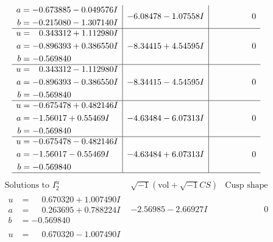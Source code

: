 \documentclass[1p]{elsarticle_modified}
\theoremstyle{definition}
\newcommand{\I}{\sqrt{-1}}
\begin{document}
$$\begin{array}{c|c|c}
\begin{aligned}
a &= -0.673885 - 0.049576 I \\
b &= -0.215080 - 1.307140 I\end{aligned}
 & -6.08478 - 1.07558 I & \phantom{-0.000000 } 0 \\ \hline\begin{aligned}
u &= \phantom{-}0.343312 + 1.112980 I \\
a &= -0.896393 + 0.386550 I \\
b &= -0.569840\phantom{ +0.000000I}\end{aligned}
 & -8.34415 + 4.54595 I & \phantom{-0.000000 } 0 \\ \hline\begin{aligned}
u &= \phantom{-}0.343312 - 1.112980 I \\
a &= -0.896393 - 0.386550 I \\
b &= -0.569840\phantom{ +0.000000I}\end{aligned}
 & -8.34415 - 4.54595 I & \phantom{-0.000000 } 0 \\ \hline\begin{aligned}
u &= -0.675478 + 0.482146 I \\
a &= -1.56017 + 0.55469 I \\
b &= -0.569840\phantom{ +0.000000I}\end{aligned}
 & -4.63484 - 6.07313 I & \phantom{-0.000000 } 0 \\ \hline\begin{aligned}
u &= -0.675478 - 0.482146 I \\
a &= -1.56017 - 0.55469 I \\
b &= -0.569840\phantom{ +0.000000I}\end{aligned}
 & -4.63484 + 6.07313 I & \phantom{-0.000000 } 0\\
 \hline 
 \end{array}$$\newpage$$\begin{array}{c|c|c}  
\text{Solutions to }I^u_{2}& \I (\text{vol} + \sqrt{-1}CS) & \text{Cusp shape}\\
 \hline 
\begin{aligned}
u &= \phantom{-}0.670320 + 1.007490 I \\
a &= \phantom{-}0.263695 + 0.788224 I \\
b &= -0.569840\phantom{ +0.000000I}\end{aligned}
 & -2.56985 - 2.66927 I & \phantom{-0.000000 } 0 \\ \hline\begin{aligned}
u &= \phantom{-}0.670320 - 1.007490 I \\

\end{aligned}
\end{array}$$
\end{document}
